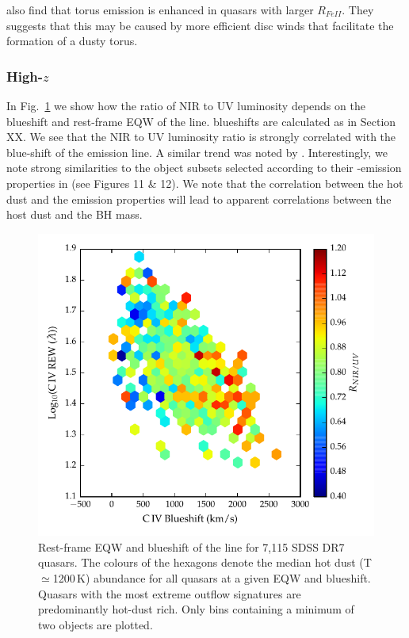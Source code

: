 \citet{shen14} also find that torus emission is enhanced in quasars with larger $R_{FeII}$.
They suggests that this may be caused by more efficient disc winds that facilitate the formation of a dusty torus. 

\subsubsection{High-$z$}

In Fig.~\ref{fig:civ_hot_dust} we show how the ratio of NIR to UV luminosity depends on the blueshift and rest-frame EQW of the  line.
 blueshifts are calculated as in Section XX. 
We see that the NIR to UV luminosity ratio is strongly correlated with the blue-shift of the  emission line. 
A similar trend was noted by \citet{wang13}. 
Interestingly, we note strong similarities to the object subsets selected according to their -emission properties in \citet{richards11} (see Figures 11 \& 12).  
We note that the correlation between the hot dust and the  emission properties will lead to apparent correlations between the host dust and the BH mass. 
 
\begin{figure}
\centering
  \includegraphics[width=\columnwidth]{figures/chapter05/hot_dust_ratio.pdf}
  \caption[{Hot dust abundance as a function of rest-frame EQW and blueshift of the  line.}]{Rest-frame EQW and blueshift of the  line for 7,115 SDSS DR7 quasars. The colours of the hexagons denote the median hot dust (T$\simeq$1200\,K) abundance for all quasars at a given EQW and blueshift. Quasars with the most extreme outflow signatures are predominantly hot-dust rich. Only bins containing a minimum of two objects are plotted.}
  \label{fig:civ_hot_dust}
\end{figure}

